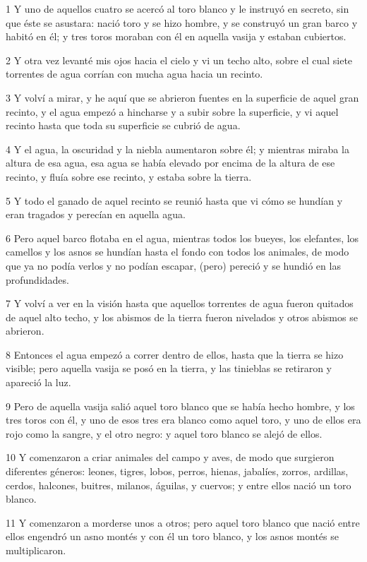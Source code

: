 \par 1 Y uno de aquellos cuatro se acercó al toro blanco y le instruyó en secreto, sin que éste se asustara: nació toro y se hizo hombre, y se construyó un gran barco y habitó en él; y tres toros moraban con él en aquella vasija y estaban cubiertos.
\par 2 Y otra vez levanté mis ojos hacia el cielo y vi un techo alto, sobre el cual siete torrentes de agua corrían con mucha agua hacia un recinto.
\par 3 Y volví a mirar, y he aquí que se abrieron fuentes en la superficie de aquel gran recinto, y el agua empezó a hincharse y a subir sobre la superficie, y vi aquel recinto hasta que toda su superficie se cubrió de agua.
\par 4 Y el agua, la oscuridad y la niebla aumentaron sobre él; y mientras miraba la altura de esa agua, esa agua se había elevado por encima de la altura de ese recinto, y fluía sobre ese recinto, y estaba sobre la tierra.
\par 5 Y todo el ganado de aquel recinto se reunió hasta que vi cómo se hundían y eran tragados y perecían en aquella agua.
\par 6 Pero aquel barco flotaba en el agua, mientras todos los bueyes, los elefantes, los camellos y los asnos se hundían hasta el fondo con todos los animales, de modo que ya no podía verlos y no podían escapar, (pero) pereció y se hundió en las profundidades.
\par 7 Y volví a ver en la visión hasta que aquellos torrentes de agua fueron quitados de aquel alto techo, y los abismos de la tierra fueron nivelados y otros abismos se abrieron.
\par 8 Entonces el agua empezó a correr dentro de ellos, hasta que la tierra se hizo visible; pero aquella vasija se posó en la tierra, y las tinieblas se retiraron y apareció la luz.
\par 9 Pero de aquella vasija salió aquel toro blanco que se había hecho hombre, y los tres toros con él, y uno de esos tres era blanco como aquel toro, y uno de ellos era rojo como la sangre, y el otro negro: y aquel toro blanco se alejó de ellos.
\par 10 Y comenzaron a criar animales del campo y aves, de modo que surgieron diferentes géneros: leones, tigres, lobos, perros, hienas, jabalíes, zorros, ardillas, cerdos, halcones, buitres, milanos, águilas, y cuervos; y entre ellos nació un toro blanco.
\par 11 Y comenzaron a morderse unos a otros; pero aquel toro blanco que nació entre ellos engendró un asno montés y con él un toro blanco, y los asnos montés se multiplicaron.
